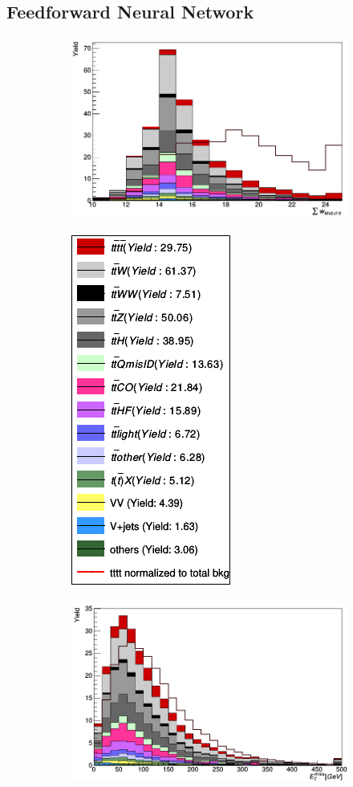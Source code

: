 \subsection*{Feedforward Neural Network}

\begin{figure}[H]
\begin{subfigure}{.5\textwidth}
  \centering
  \includegraphics[width=.99\linewidth]{figs/features/MV2c10}
\end{subfigure}%
\begin{subfigure}{.5\textwidth}
  \centering
  \includegraphics[width=.29\linewidth]{figs/features/legende}
\end{subfigure}
\begin{subfigure}{.5\textwidth}
  \centering
  \includegraphics[width=.99\linewidth]{figs/features/met_met}

\end{subfigure}
\end{figure}
